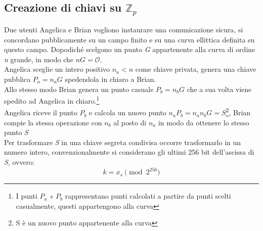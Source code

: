 \documentclass[12pt, a4paper]{report}
\begin{document}
\subsection{Creazione di chiavi su $\mathbb{Z}_p$}
\label{sec:creazione_di_chiavi}
Due utenti Angelica e Brian vogliono instaurare una comunicazione sicura, si concordano pubblicamente su un campo finito e su una curva ellittica definita su questo campo.
Dopodiché scelgono un punto \textit{G} appartenente alla curva di ordine \textit{n} grande, in modo che $nG = \mathcal{O}$.
\\Angelica sceglie un intero positivo $n_a < n$ come chiave privata, genera una chiave pubblica $P_a = n_aG$ spedendola in chiaro a Brian.
\\Allo stesso modo Brian genera un punto casuale $P_b = n_bG$ che a sua volta viene spedito ad Angelica in chiaro.\footnote{I punti \textit{$P_a$ e $P_b$} rappresentano punti calcolati a partire da punti scelti casualmente, questi appartengono alla curva}
\\Angelica riceve il punto $P_b$ e calcola un nuovo punto $n_aP_b = n_an_bG = S$\footnote{S è un nuovo punto appartenente alla curva}, Brian compie la stessa operazione con $n_b$ al posto di $n_a$ in modo da ottenere lo stesso punto \textit{S}
\\ Per trasformare \textit{S} in una chiave segreta condivisa occorre trasformarlo in un numero intero, convenzionalmente si considerano gli ultimi 256 bit dell'ascissa di \textit{S}, ovvero:
\begin{equation}
    k = x_s\pmod2^{256}
\end{equation}
\end{document}
